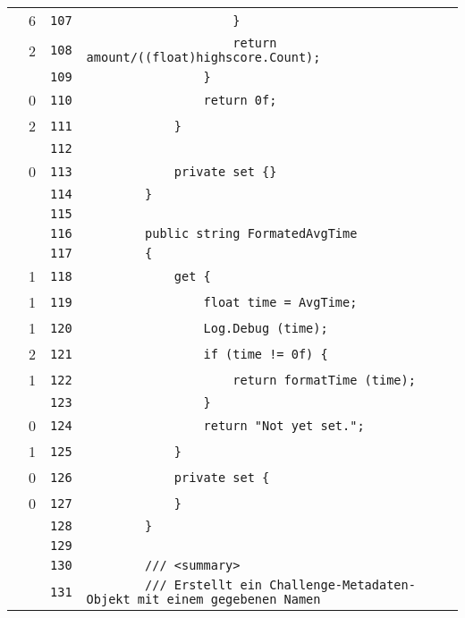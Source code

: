 \documentclass[a4paper,10pt]{article}
\begin{document}
\begin{longtable}[l]{lrrl}
\cellcolor{green} & 6 & \verb~107~ & \verb~                    }~\\
\cellcolor{green} & 2 & \verb~108~ & \verb~                    return amount/((float)highscore.Count);~\\
\cellcolor{gray} &  & \verb~109~ & \verb~                }~\\
\cellcolor{red} & 0 & \verb~110~ & \verb~                return 0f;~\\
\cellcolor{green} & 2 & \verb~111~ & \verb~            }~\\
\cellcolor{gray} &  & \verb~112~ & \verb~~\\
\cellcolor{red} & 0 & \verb~113~ & \verb~            private set {}~\\
\cellcolor{gray} &  & \verb~114~ & \verb~        }~\\
\cellcolor{gray} &  & \verb~115~ & \verb~~\\
\cellcolor{gray} &  & \verb~116~ & \verb~        public string FormatedAvgTime~\\
\cellcolor{gray} &  & \verb~117~ & \verb~        {~\\
\cellcolor{green} & 1 & \verb~118~ & \verb~            get {~\\
\cellcolor{green} & 1 & \verb~119~ & \verb~                float time = AvgTime;~\\
\cellcolor{green} & 1 & \verb~120~ & \verb~                Log.Debug (time);~\\
\cellcolor{green} & 2 & \verb~121~ & \verb~                if (time != 0f) {~\\
\cellcolor{green} & 1 & \verb~122~ & \verb~                    return formatTime (time);~\\
\cellcolor{gray} &  & \verb~123~ & \verb~                }~\\
\cellcolor{red} & 0 & \verb~124~ & \verb~                return "Not yet set.";~\\
\cellcolor{green} & 1 & \verb~125~ & \verb~            }~\\
\cellcolor{red} & 0 & \verb~126~ & \verb~            private set {~\\
\cellcolor{red} & 0 & \verb~127~ & \verb~            }~\\
\cellcolor{gray} &  & \verb~128~ & \verb~        }~\\
\cellcolor{gray} &  & \verb~129~ & \verb~~\\
\cellcolor{gray} &  & \verb~130~ & \verb~        /// <summary>~\\
\cellcolor{gray} &  & \verb~131~ & \verb~        /// Erstellt ein Challenge-Metadaten-Objekt mit einem gegebenen Namen ~\\

\end{longtable}
\end{document}
